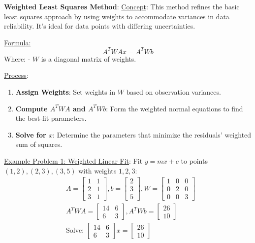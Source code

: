 \documentclass[8pt, a4paper, landscape]{extarticle} %
\begin{document}
\begin{multicols*}{4}
  \textbf{Weighted Least Squares Method}:
  \underline{Concept}: This method refines the basic least squares approach by using weights to accommodate variances in data reliability. It's ideal for data points with differing uncertainties.

  \underline{Formula:}
  \[ A^T W A x = A^T W b \]
  Where:
  - \( W \) is a diagonal matrix of weights.

  \underline{Process}:
  \begin{enumerate}
    \item \textbf{Assign Weights}: Set weights in \( W \) based on observation variances.
    \item \textbf{Compute \( A^TWA \) and \( A^TWb \)}: Form the weighted normal equations to find the best-fit parameters.
    \item \textbf{Solve for \( x \)}: Determine the parameters that minimize the residuals' weighted sum of squares.
  \end{enumerate}

  \underline{Example Problem 1: Weighted Linear Fit}:
  Fit \( y = mx + c \) to points \( (1,2), (2,3), (3,5) \) with weights \( 1, 2, 3 \):
  \[
    \begin{aligned}
       & A = \begin{bmatrix} 1 & 1 \\ 2 & 1 \\ 3 & 1 \end{bmatrix}, b = \begin{bmatrix} 2 \\ 3 \\ 5 \end{bmatrix}, W = \begin{bmatrix} 1 & 0 & 0 \\ 0 & 2 & 0 \\ 0 & 0 & 3 \end{bmatrix} \\
       & A^T W A = \begin{bmatrix} 14 & 6 \\ 6 & 3 \end{bmatrix}, A^T W b = \begin{bmatrix} 26 \\ 10 \end{bmatrix}                                                                       \\
       & \text{Solve: } \begin{bmatrix} 14 & 6 \\ 6 & 3 \end{bmatrix} x = \begin{bmatrix} 26 \\ 10 \end{bmatrix}
    \end{aligned}
  \]



\end{multicols*}
\end{document}
